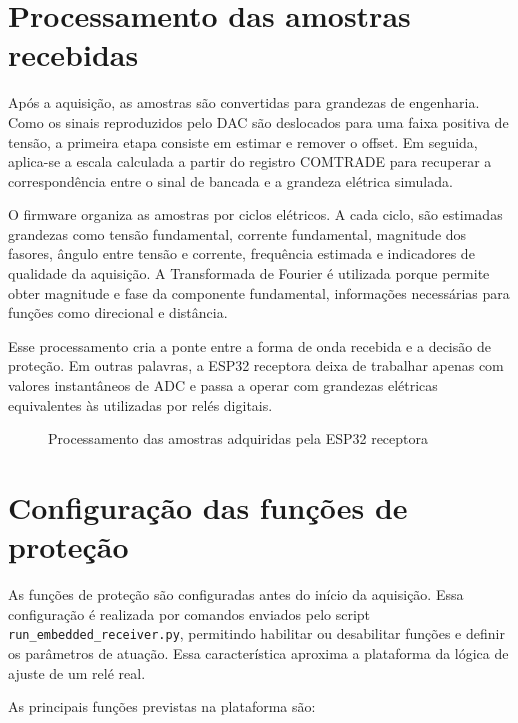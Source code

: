 \section{Processamento das amostras recebidas}

Após a aquisição, as amostras são convertidas para grandezas de engenharia. Como os sinais reproduzidos pelo DAC são deslocados para uma faixa positiva de tensão, a primeira etapa consiste em estimar e remover o offset. Em seguida, aplica-se a escala calculada a partir do registro COMTRADE para recuperar a correspondência entre o sinal de bancada e a grandeza elétrica simulada.

O firmware organiza as amostras por ciclos elétricos. A cada ciclo, são estimadas grandezas como tensão fundamental, corrente fundamental, magnitude dos fasores, ângulo entre tensão e corrente, frequência estimada e indicadores de qualidade da aquisição. A Transformada de Fourier é utilizada porque permite obter magnitude e fase da componente fundamental, informações necessárias para funções como direcional e distância.

Esse processamento cria a ponte entre a forma de onda recebida e a decisão de proteção. Em outras palavras, a ESP32 receptora deixa de trabalhar apenas com valores instantâneos de ADC e passa a operar com grandezas elétricas equivalentes às utilizadas por relés digitais.

\begin{figure}[H]
  \centering
  \caption{Processamento das amostras adquiridas pela ESP32 receptora}
  \label{fig:processamento-receptor}
\end{figure}

\section{Configuração das funções de proteção}

As funções de proteção são configuradas antes do início da aquisição. Essa configuração é realizada por comandos enviados pelo script \texttt{run\_embedded\_receiver.py}, permitindo habilitar ou desabilitar funções e definir os parâmetros de atuação. Essa característica aproxima a plataforma da lógica de ajuste de um relé real.

As principais funções previstas na plataforma são:

